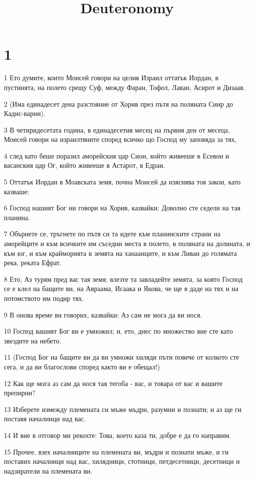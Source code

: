 

\title{Deuteronomy}


\chapter{1}

\par 1 Ето думите, които Моисей говори на целия Израил оттатък Иордан, в пустинята, на полето срещу Суф, между Фаран, Тофол, Лаван, Асирот и Дизаав.
\par 2 (Има единадесет дена разстояние от Хорив през пътя на поляната Сиир до Кадис-варни).
\par 3 В четиридесетата година, в единадесетия месец на първия ден от месеца, Моисей говори на израилтяните според всичко що Господ му заповяда за тях,
\par 4 след като беше поразил аморейския цар Сион, който живееше в Есевон и васанския цар Ог, който живееше в Астарот, в Едраи.
\par 5 Оттатък Иордан в Моавската земя, почна Моисей да изяснява тоя закон, като казваше:
\par 6 Господ нашият Бог ни говори на Хорив, казвайки: Доволно сте седели на тая планина.
\par 7 Обърнете се, тръгнете по пътя си та идете към планинските страни на аморейците и към всичките им съседни места в полето, в поляната на долината, и към юг, и към крайморията в земята на ханаанците, и към Ливан до голямата река, реката Ефрат.
\par 8 Ето, Аз турям пред вас тая земя; влезте та завладейте земята, за която Господ се е клел на бащите ви, на Авраама, Исаака и Якова, че ще я даде на тях и на потомството им подир тях.
\par 9 В онова време ви говорих, казвайки: Аз сам не мога да ви нося.
\par 10 Господ вашият Бог ви е умножил; и, ето, днес по множество вие сте като звездите на небето.
\par 11 (Господ Бог на бащите ви да ви умножи хиляди пъти повече от колкото сте сега, и да ви благослови според както ви е обещал!)
\par 12 Как ще мога аз сам да нося тая тегоба - вас, и товара от вас и вашите препирни?
\par 13 Изберете измежду племената си мъже мъдри, разумни и познати; и аз ще ги поставя началници над вас.
\par 14 И вие в отговор ми рекохте: Това, което каза ти, добре е да го направим.
\par 15 Прочее, взех началниците на племената ви, мъдри и познати мъже, и ги поставих началници над вас, хилядници, стотници, петдесетници, десетници и надзиратели на племената ви.
